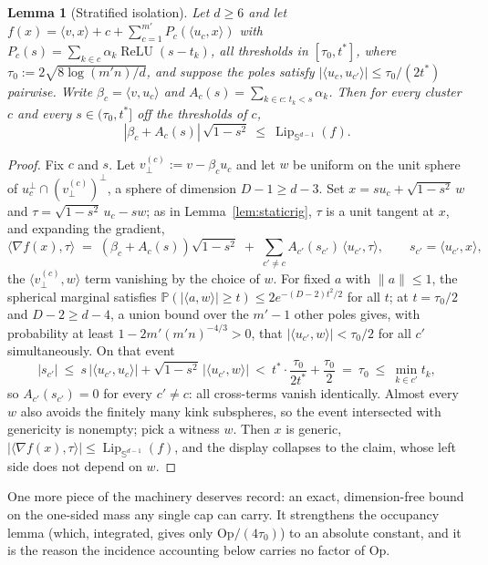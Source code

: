 \documentclass[11pt,reqno]{amsart}
\theoremstyle{plain}
\newtheorem{lemma}[theorem]{Lemma}
\theoremstyle{definition}
\theoremstyle{remark}
\newcommand{\Sd}{\mathbb{S}^{d-1}}
\newcommand{\PP}{\mathbb{P}}
\newcommand{\Lip}{\operatorname{Lip}}
\newcommand{\relu}{\operatorname{ReLU}}
\newcommand{\inn}[2]{\langle #1,#2\rangle}
\begin{document}
\begin{lemma}[Stratified isolation]\label{lem:stratiso}
Let $d\ge6$ and let $f(x)=\inn vx+c+\sum_{c=1}^{m'}P_c(\inn{u_c}x)$ with $P_c(s)=\sum_{k\in c}\alpha_k\relu(s-t_k)$, all thresholds in $[\tau_0,t^\ast]$, where $\tau_0:=2\sqrt{8\log(m'n)/d}$, and suppose the poles satisfy $|\inn{u_c}{u_{c'}}|\le\tau_0/(2t^\ast)$ pairwise. Write $\beta_c=\inn v{u_c}$ and $A_c(s)=\sum_{k\in c:\,t_k<s}\alpha_k$. Then for every cluster $c$ and every $s\in(\tau_0,t^\ast]$ off the thresholds of $c$,
\[
|\beta_c+A_c(s)|\,\sqrt{1-s^2}\ \le\ \Lip_{\Sd}(f).
\]
\end{lemma}
\begin{proof}[Proof]
Fix $c$ and $s$. Let $v^{(c)}_\perp:=v-\beta_cu_c$ and let $w$ be uniform on the unit sphere of $u_c^\perp\cap(v^{(c)}_\perp)^\perp$, a sphere of dimension $D-1\ge d-3$. Set $x=su_c+\sqrt{1-s^2}\,w$ and $\tau=\sqrt{1-s^2}\,u_c-sw$; as in Lemma~\ref{lem:staticrig}, $\tau$ is a unit tangent at $x$, and expanding the gradient,
\[
\inn{\nabla f(x)}\tau\;=\;(\beta_c+A_c(s))\sqrt{1-s^2}\;+\;\sum_{c'\ne c}A_{c'}(s_{c'})\,\inn{u_{c'}}\tau,\qquad s_{c'}=\inn{u_{c'}}x,
\]
the $\inn{v^{(c)}_\perp}w$ term vanishing by the choice of $w$. For fixed $a$ with $\|a\|\le1$, the spherical marginal satisfies $\PP(|\inn aw|\ge t)\le2e^{-(D-2)t^2/2}$ for all $t$; at $t=\tau_0/2$ and $D-2\ge d-4$, a union bound over the $m'-1$ other poles gives, with probability at least $1-2m'(m'n)^{-4/3}>0$, that $|\inn{u_{c'}}w|<\tau_0/2$ for all $c'$ simultaneously. On that event
\[
|s_{c'}|\ \le\ s\,|\inn{u_{c'}}{u_c}|+\sqrt{1-s^2}\,|\inn{u_{c'}}w|\ <\ t^\ast\cdot\frac{\tau_0}{2t^\ast}+\frac{\tau_0}2\ =\ \tau_0\ \le\ \min_{k\in c'}t_k,
\]
so $A_{c'}(s_{c'})=0$ for every $c'\ne c$: all cross-terms vanish identically. Almost every $w$ also avoids the finitely many kink subspheres, so the event intersected with genericity is nonempty; pick a witness $w$. Then $x$ is generic, $|\inn{\nabla f(x)}\tau|\le\Lip_{\Sd}(f)$, and the display collapses to the claim, whose left side does not depend on $w$.
\end{proof}

One more piece of the machinery deserves record: an exact, dimension-free bound on the one-sided mass any single cap can carry. It strengthens the occupancy lemma (which, integrated, gives only $\mathrm{Op}/(4\tau_0)$) to an absolute constant, and it is the reason the incidence accounting below carries no factor of $\mathrm{Op}$.
\end{document}

